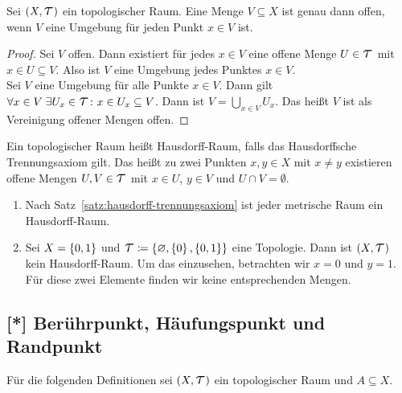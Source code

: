 \begin{satz} %
    Sei $\pair{X, \Tau}$ ein topologischer Raum. Eine Menge $V\subseteq X$ ist genau dann offen, wenn $V$ eine Umgebung für jeden Punkt $x\in V$ ist.
    \begin{proof}
        \anf{$\impl$} Sei $V$ offen. Dann existiert für jedes $x\in V$ eine offene Menge $U\in\Tau$ mit $x\in U\subseteq V$. Also ist $V$ eine Umgebung jedes Punktes $x\in V$.\\[.5\baselineskip]
        \anf{$\Leftarrow$} Sei $V$ eine Umgebung für alle Punkte $x\in V$. Dann gilt $\forall x\in V\ex U_x \in \Tau\colon x\in U_x \subseteq V$. Dann ist $V=\bigcup_{x\in V} U_x$. Das heißt $V$ ist als Vereinigung offener Mengen offen.
    \end{proof}
\end{satz}

\begin{definition}
    Ein topologischer Raum heißt Hausdorff-Raum, falls das Hausdorffsche Trennungsaxiom gilt. Das heißt zu zwei Punkten $x,y\in X$ mit $x\neq y$ existieren offene Mengen $U,V\in\Tau$ mit $x\in U$, $y\in V$ und $U\cap V = \emptyset$.
\end{definition}

\begin{beispiel}
    \theoremescape
    \begin{enumerate}
        \item Nach Satz~\ref{satz:hausdorff-trennungsaxiom} ist jeder metrische Raum ein Hausdorff-Raum.
        \item Sei $X=\left\{0, 1\right\}$ und $\Tau\coloneqq \set{\emptyset, \set{0}, \set{0, 1}}$ eine Topologie. Dann ist $\pair{X, \Tau}$ kein Hausdorff-Raum. Um das einzusehen, betrachten wir $x=0$ und $y=1$. Für diese zwei Elemente finden wir keine entsprechenden Mengen.
    \end{enumerate}
\end{beispiel}

\subsection{[*] Berührpunkt, Häufungspunkt und Randpunkt}

\begin{mdframed}
    \begin{center}
        Für die folgenden Definitionen sei $\pair{X, \Tau}$ ein topologischer Raum und $A\subseteq X$.
    \end{center}
\end{mdframed}

